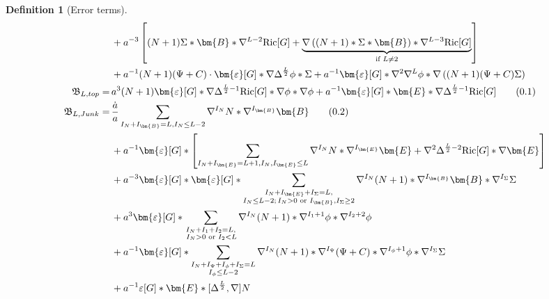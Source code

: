 \documentclass[11pt,leqno,textwidth=10cm]{amsart}
\numberwithin{equation}{section}
\theoremstyle{definition}
\newtheorem{definition}{Definition}[section]
\theoremstyle{plain}
\newcommand{\1}{\mathbbm{1}}
\newcommand{\I}{\mathbb{I}}
\newcommand{\Ric}{\text{\normalfont{Ric}}}
\renewcommand{\epsilon}{\varepsilon}
\newcommand{\Lap}{\Delta}
\newcommand{\numberthis}{\addtocounter{equation}{1}\tag{\theequation}}
\renewcommand{\theequation}{\arabic{section}.\arabic{equation}}
\newcommand{\RE}{\bm{E}}
\newcommand{\RB}{\bm{B}}
\newcommand{\epsilonLC}{\bm{\epsilon}}
\begin{document}
\begin{definition}[Error terms]
{\begin{subequations}
\begin{align*}
&\,+a^{-3}\left[(N+1)\Sigma\ast\RB\ast\nabla^{L-2}\Ric[G]+\underbrace{\nabla\left((N+1)\ast\Sigma\ast\RB\right)\ast\nabla^{L-3}\Ric[G]}_{\text{if }L\neq 2}\right]\\
&\,+a^{-1}(N+1)(\Psi+C)\cdot\epsilonLC[G]\ast\nabla\Lap^\frac{L}2\phi\ast\Sigma+a^{-1}\epsilonLC[G]\ast\nabla^2\nabla^L\phi\ast\nabla\left((N+1)(\Psi+C)\Sigma\right)\\
\mathfrak{B}_{L,top}=&\,a^3(N+1)\epsilonLC[G]\ast\nabla\Lap^{\frac{L}2-1}\Ric[G]\ast\nabla\phi\ast\nabla\phi+a^{-1}\epsilonLC[G]\ast\RE\ast\nabla\Lap^{\frac{L}2-1}\Ric[G] \numberthis\label{eq:comeq-RB-top}\\
\mathfrak{B}_{L,Junk}=&\,\frac{\dot{a}}a\sum_{I_N+I_{\RB}=L,I_{N}\leq L-2}\nabla^{I_N}N\ast\nabla^{I_{\RB}}\RB \numberthis\label{eq:comeq-RB-junk}\\
&\,+a^{-1}\epsilonLC[G]\ast\left[\sum_{I_N+I_{\RE}=L+1,I_{N},I_{\RE}\leq L}\nabla^{I_N}N\ast\nabla^{I_{\RE}}\RE+\nabla^2\Lap^{\frac{L}2-2}\Ric[G]\ast\nabla\RE\right] \\
&\,+a^{-3}\epsilonLC[G]\ast\epsilonLC[G]\ast\sum_{\substack{I_N+I_{\RE}+I_\Sigma=L,\\ I_N\leq L-2;\,I_N>0\text{ or }I_{\RB},I_{\Sigma}\geq 2}}\nabla^{I_N}(N+1)\ast\nabla^{I_{\RB}}\RB\ast\nabla^{I_\Sigma}\Sigma\\
&\,+a^3\epsilonLC[G]\ast\sum_{\substack{I_N+I_{1}+I_{2}=L,\\ \,I_N>0\text{ or }I_2< L}}\nabla^{I_N}(N+1)\ast\nabla^{I_{1}+1}\phi\ast\nabla^{I_{2}+2}\phi\\
&\,+a^{-1}\epsilonLC[G]\ast\sum_{\substack{I_N+I_\Psi+I_\phi+I_\Sigma=L\\I_\phi\leq L-2}}\nabla^{I_N}(N+1)\ast\nabla^{I_\Psi}(\Psi+C)\ast\nabla^{I_\phi+1}\phi\ast\nabla^{I_\Sigma}\Sigma\\
&\,+a^{-1}\epsilon[G]\ast\RE\ast[\Lap^{\frac{L}2},\nabla]N\\

\end{align*}
\end{subequations}}
\end{definition}
\end{document}
